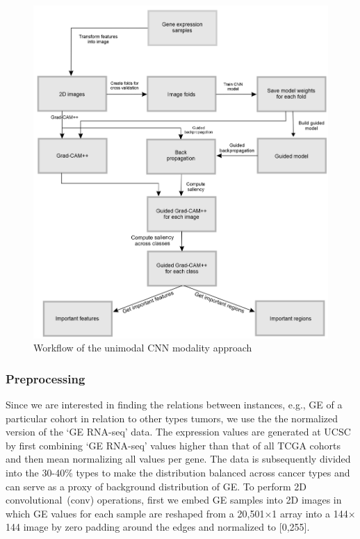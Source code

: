 \begin{figure}
	\centering
	\includegraphics[scale=1.0]{images/wf_2D_CNN.png}
    \caption{Workflow of the unimodal CNN modality approach}	
	\label{fig:workflow_2D_CNN}
\end{figure}

\subsubsection{Preprocessing}
Since we are interested in finding the relations between instances, e.g., GE of a particular cohort in relation to other types tumors, we use the the normalized version of the `GE RNA-seq' data. The expression values are generated at UCSC by first combining `GE RNA-seq' values higher than that of all TCGA cohorts and then mean normalizing all values per gene. The data is subsequently divided into the 30-40\% types to make the distribution balanced across cancer types and can serve as a proxy of background distribution of GE. To perform 2D  convolutional~(conv) operations, first we embed GE samples into 2D images in which GE values for each sample are reshaped from a 20,501$\times$1 array into a 144$\times$144 image by zero padding around the edges and normalized to [0,255].%


